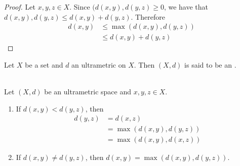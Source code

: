 \documentclass{book}
\begin{document}
\begin{proof}
	Let $x,y,z \in X$. Since $(d(x,y) , d(y,z) \geq 0$, we have that $d(x,y), d(y,z) \leq  d(x,y) + d(y,z)$. Therefore
	\begin{align*}
		d(x,y)
		& \leq \max(d(x,y) , d(y,z)) \\
		& \leq  d(x,y) + d(y,z)
	\end{align*}
\end{proof}

\begin{defn}
	Let $X$ be a set and $d$ an ultrametric on $X$. Then $(X, d)$ is said to be an .
\end{defn}

\begin{ex}  \\
	Let $(X,d)$ be an ultrametric space and $x,y, z \in X$. 
	\begin{enumerate}
		\item If $d(x,y) < d(y,z)$, then 
		\begin{align*}
			d(y,z)
			& = d(x,z) \\
			& = \max(d(x,y), d(y,z)) \\
			& = \max(d(x,y), d(x,z))
		\end{align*}
		\item If $d(x,y) \neq d(y,z)$, then $d(x,y) = \max(d(x,y), d(y,z))$.
	\end{enumerate} 
\end{ex}
\end{document}
